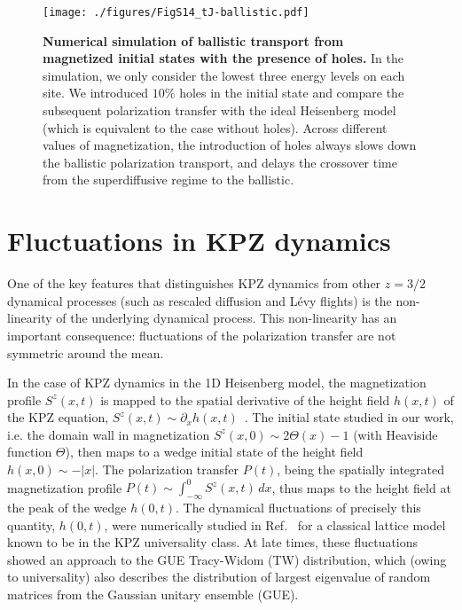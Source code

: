 \documentclass[
 reprint,
 superscriptaddress,
 amsmath,amssymb,
 aps,
 pra,
]{revtex4-2}
\begin{document}
\begin{figure}[t!]
    \centering
    \texttt{[image: ./figures/FigS14\_tJ-ballistic.pdf]}
    \caption{\textbf{Numerical simulation of ballistic transport from magnetized initial states with the presence of holes.}
        In the simulation, we only consider the lowest three energy levels on each site.
        We introduced $10\%$ holes in the initial state and compare the subsequent polarization transfer with the ideal Heisenberg model (which is equivalent to the case without holes).
        Across different values of magnetization, the introduction of holes always slows down the ballistic polarization transport, and delays the crossover time from the superdiffusive regime to the ballistic. 
    }
    \label{fig:ballistic_tJ}
\end{figure}



\section{Fluctuations in KPZ dynamics}

One of the key features that distinguishes KPZ dynamics from other $z=3/2$ dynamical processes (such as rescaled diffusion and L\'evy flights) is the non-linearity of the underlying dynamical process.
This non-linearity has an important consequence: fluctuations of the polarization transfer are not symmetric around the mean.

In the case of KPZ dynamics in the 1D Heisenberg model, the magnetization profile $S^z (x, t)$ is mapped to the spatial derivative of the height field $h (x, t)$ of the KPZ equation, $S^z (x, t) \sim \partial_x h (x,t)$~\cite{Ljubotina2019}.
The initial state studied in our work, i.e. the domain wall in magnetization $S^z (x, 0) \sim 2 \Theta (x) - 1$ (with Heaviside function $\Theta$), then maps to a wedge initial state of the height field $h (x, 0) \sim -|x|$.
The polarization transfer $P(t)$, being the spatially integrated magnetization profile $P (t) \sim \int_{-\infty}^0 S^z (x, t)\,dx$, thus maps to the height field at the peak of the wedge $h(0, t)$.
The dynamical fluctuations of precisely this quantity, $h(0, t)$, were numerically studied in Ref.~\cite{Hartmann2018} for a classical lattice model known to be in the KPZ universality class. At late times, these fluctuations showed an approach to the GUE Tracy-Widom (TW) distribution, which (owing to universality) also describes the distribution of largest eigenvalue of random matrices from the Gaussian unitary ensemble (GUE).
\end{document}
